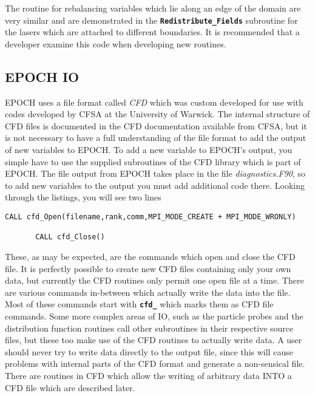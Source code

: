 \documentclass[12pt]{article}
\newcommand{\simpleboxverbatim}{\begin{Verbatim}[obeytabs=true,frame=single,
  framerule=0.5mm,rulecolor=\color{warwickmid}]}
\newcommand{\inlinecode}[1]{{\color{warwickred} \bf\texttt{#1}}}
\newcommand{\nEPOCH}{{\color{warwickdark}\fontfamily{phv}\selectfont EPOCH}}
\newcommand{\EPOCH}{{\nEPOCH} }
\begin{document}
The routine for rebalancing variables which lie along an edge of the domain are
very similar and are demonstrated in the \inlinecode{Redistribute\_Fields}
subroutine for the lasers which are attached to different boundaries. It is
recommended that a developer examine this code when developing new routines.

\subsection{\EPOCH IO}

\EPOCH uses a file format called {\it CFD} which was custom developed for use
with codes developed by CFSA at the University of Warwick. The internal
structure of CFD files is documented in the CFD documentation available from
CFSA, but it is not necessary to have a full understanding of the file format
to add the output of new variables to \nEPOCH. To add a new variable to EPOCH's
output, you simple have to use the supplied subroutines of the CFD library
which is part of \nEPOCH. The file output from \EPOCH takes place in the file
{\it diagnostics.F90}, so to add new variables to the output you must add
additional code there. Looking through the listings, you will see two lines

\simpleboxverbatim
       CALL cfd_Open(filename,rank,comm,MPI_MODE_CREATE + MPI_MODE_WRONLY)

       CALL cfd_Close()
\end{Verbatim}

These, as may be expected, are the commands which open and close the CFD
file. It is perfectly possible to create new CFD files containing only your own
data, but currently the CFD routines only permit one open file at a time. There
are various commands in-between which actually write the data into the
file. Most of these commands start with \inlinecode{cfd\_} which marks them as
CFD file commands. Some more complex areas of IO, such as the particle probes
and the distribution function routines call other subroutines in their
respective source files, but these too make use of the CFD routines to actually
write data. A user should never try to write data directly to the output file,
since this will cause problems with internal parts of the CFD format and
generate a non-sensical file. There are routines in CFD which allow the writing
of arbitrary data INTO a CFD file which are described later.
\end{document}
